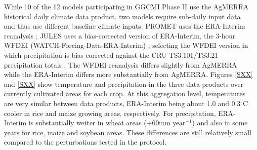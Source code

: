 \documentclass[gmd, manuscript]{copernicus} %
\begin{document}

While 10 of the 12 models participating in GGCMI Phase II use the AgMERRA historical daily climate data product, two models require sub-daily input data and thus use different baseline climate inputs:
PROMET uses the ERA-Interim reanalysis \citep{dee2011era}; JULES uses a bias-corrected version of ERA-Interim, the 3-hour WFDEI (WATCH-Forcing-Data-ERA-Interim) \citep{weedon2014wfdei}, selecting the WFDEI version in which precipitation is bias-corrected against the CRU TS3.101/TS3.21 precipitation totals \citep{harris_cru_2014}.
The WFDEI reanalysis differs slightly from AgMERRA while the ERA-Interim differs more substantially from AgMERRA. 
Figures \ref{SXX} and \ref{SXX} show temperature and precipitation in the three data products over currently cultivated areas for each crop. At this aggregation level, temperatures are very similar between data products, ERA-Interim being about 1.0 and 0.3$^{\circ}$C cooler in rice and maize growing areas, respectively. 
For precipitation, ERA-Interim is substantially wetter in wheat areas (+60mm year$^{-1}$) and also in some years for rice, maize and soybean areas.
These differences are still relatively small compared to the perturbations tested in the protocol.
\end{document}
